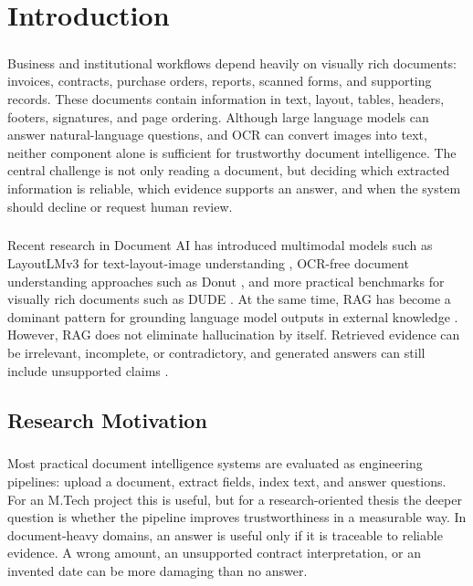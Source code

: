 \chapter{Introduction}
\label{chap:introduction}

\paragraph{} Business and institutional workflows depend heavily on visually rich documents: invoices, contracts, purchase orders, reports, scanned forms, and supporting records. These documents contain information in text, layout, tables, headers, footers, signatures, and page ordering. Although large language models can answer natural-language questions, and OCR can convert images into text, neither component alone is sufficient for trustworthy document intelligence. The central challenge is not only reading a document, but deciding which extracted information is reliable, which evidence supports an answer, and when the system should decline or request human review.

\paragraph{} Recent research in Document AI has introduced multimodal models such as LayoutLMv3 for text-layout-image understanding \cite{huang2022layoutlmv3}, OCR-free document understanding approaches such as Donut \cite{kim2022donut}, and more practical benchmarks for visually rich documents such as DUDE \cite{vanlandeghem2023dude}. At the same time, RAG has become a dominant pattern for grounding language model outputs in external knowledge \cite{lewis2020rag}. However, RAG does not eliminate hallucination by itself. Retrieved evidence can be irrelevant, incomplete, or contradictory, and generated answers can still include unsupported claims \cite{niu2024ragtruth}.

\section{Research Motivation}
\paragraph{} Most practical document intelligence systems are evaluated as engineering pipelines: upload a document, extract fields, index text, and answer questions. For an M.Tech project this is useful, but for a research-oriented thesis the deeper question is whether the pipeline improves trustworthiness in a measurable way. In document-heavy domains, an answer is useful only if it is traceable to reliable evidence. A wrong amount, an unsupported contract interpretation, or an invented date can be more damaging than no answer.

